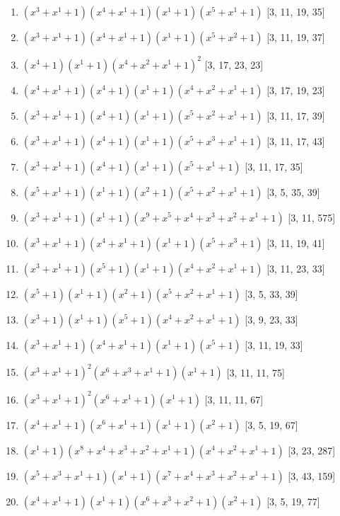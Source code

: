 \documentclass[10pt,twocolumn]{article}
\begin{document}
\begin{enumerate}
\item $(x^{3} + x^{1} + 1)(x^{4} + x^{1} + 1)(x^{1} + 1)(x^{5} + x^{1} + 1)$  [3, 11, 19, 35]
\item $(x^{3} + x^{1} + 1)(x^{4} + x^{1} + 1)(x^{1} + 1)(x^{5} + x^{2} + 1)$  [3, 11, 19, 37]
\item $(x^{4} + 1)(x^{1} + 1)(x^{4} + x^{2} + x^{1} + 1)^{2}$  [3, 17, 23, 23]
\item $(x^{4} + x^{1} + 1)(x^{4} + 1)(x^{1} + 1)(x^{4} + x^{2} + x^{1} + 1)$  [3, 17, 19, 23]
\item $(x^{3} + x^{1} + 1)(x^{4} + 1)(x^{1} + 1)(x^{5} + x^{2} + x^{1} + 1)$  [3, 11, 17, 39]
\item $(x^{3} + x^{1} + 1)(x^{4} + 1)(x^{1} + 1)(x^{5} + x^{3} + x^{1} + 1)$  [3, 11, 17, 43]
\item $(x^{3} + x^{1} + 1)(x^{4} + 1)(x^{1} + 1)(x^{5} + x^{1} + 1)$  [3, 11, 17, 35]
\item $(x^{5} + x^{1} + 1)(x^{1} + 1)(x^{2} + 1)(x^{5} + x^{2} + x^{1} + 1)$  [3, 5, 35, 39]
\item $(x^{3} + x^{1} + 1)(x^{1} + 1)(x^{9} + x^{5} + x^{4} + x^{3} + x^{2} + x^{1} + 1)$  [3, 11, 575]
\item $(x^{3} + x^{1} + 1)(x^{4} + x^{1} + 1)(x^{1} + 1)(x^{5} + x^{3} + 1)$  [3, 11, 19, 41]
\item $(x^{3} + x^{1} + 1)(x^{5} + 1)(x^{1} + 1)(x^{4} + x^{2} + x^{1} + 1)$  [3, 11, 23, 33]
\item $(x^{5} + 1)(x^{1} + 1)(x^{2} + 1)(x^{5} + x^{2} + x^{1} + 1)$  [3, 5, 33, 39]
\item $(x^{3} + 1)(x^{1} + 1)(x^{5} + 1)(x^{4} + x^{2} + x^{1} + 1)$  [3, 9, 23, 33]
\item $(x^{3} + x^{1} + 1)(x^{4} + x^{1} + 1)(x^{1} + 1)(x^{5} + 1)$  [3, 11, 19, 33]
\item $(x^{3} + x^{1} + 1)^{2}(x^{6} + x^{3} + x^{1} + 1)(x^{1} + 1)$  [3, 11, 11, 75]
\item $(x^{3} + x^{1} + 1)^{2}(x^{6} + x^{1} + 1)(x^{1} + 1)$  [3, 11, 11, 67]
\item $(x^{4} + x^{1} + 1)(x^{6} + x^{1} + 1)(x^{1} + 1)(x^{2} + 1)$  [3, 5, 19, 67]
\item $(x^{1} + 1)(x^{8} + x^{4} + x^{3} + x^{2} + x^{1} + 1)(x^{4} + x^{2} + x^{1} + 1)$  [3, 23, 287]
\item $(x^{5} + x^{3} + x^{1} + 1)(x^{1} + 1)(x^{7} + x^{4} + x^{3} + x^{2} + x^{1} + 1)$  [3, 43, 159]
\item $(x^{4} + x^{1} + 1)(x^{1} + 1)(x^{6} + x^{3} + x^{2} + 1)(x^{2} + 1)$  [3, 5, 19, 77]

\end{enumerate}
\end{document}
